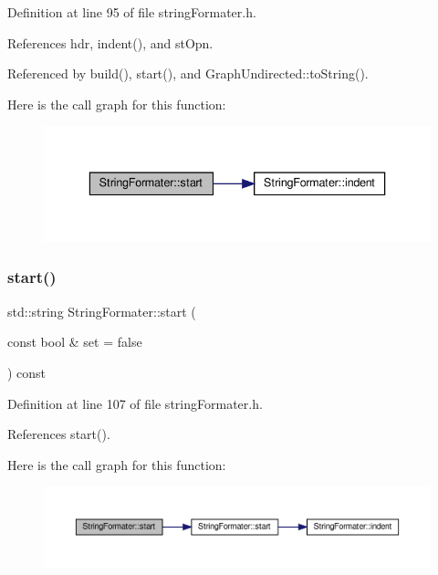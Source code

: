 Definition at line 95 of file string\+Formater.\+h.



References hdr, indent(), and st\+Opn.



Referenced by build(), start(), and Graph\+Undirected\+::to\+String().

Here is the call graph for this function\+:
\nopagebreak
\begin{figure}[H]
\begin{center}
\leavevmode
\includegraphics[width=336pt]{classStringFormater_a4eda27368789110bef0e4c3401587efd_cgraph}
\end{center}
\end{figure}
\mbox{\label{classStringFormater_a4685d33ea6f692029e79fa0e083253fd}} 
\subsubsection{\texorpdfstring{start()}{start()}\hspace{0.1cm}{\footnotesize\ttfamily [2/2]}}
{\footnotesize\ttfamily std\+::string String\+Formater\+::start (\begin{DoxyParamCaption}\item[{const bool \&}]{set = {\ttfamily false} }\end{DoxyParamCaption}) const\hspace{0.3cm}{\ttfamily [inline]}}



Definition at line 107 of file string\+Formater.\+h.



References start().

Here is the call graph for this function\+:
\nopagebreak
\begin{figure}[H]
\begin{center}
\leavevmode
\includegraphics[width=350pt]{classStringFormater_a4685d33ea6f692029e79fa0e083253fd_cgraph}
\end{center}
\end{figure}
\mbox{\label{classStringFormater_aa28994ecf2e66952f6f4535c9b544d47}} 
